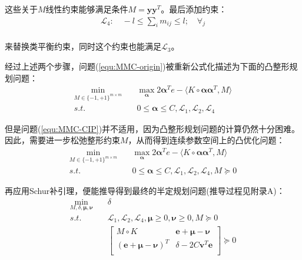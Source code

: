 这些关于$M$线性约束能够满足条件$M=\mathbf{yy}^T$。最后添加约束：
\begin{equation*}
\begin{split}
\mathcal{L}_4:\quad -l \le \sum_im_{ij} \le l; \quad \forall_j \\
\end{split}
\end{equation*}

来替换类平衡约束，同时这个约束也能满足$\mathcal{L}_3$。

经过上述两个步骤，问题(\ref{equ:MMC-origin})被重新公式化描述为下面的凸整形规划问题：
\begin{equation}
\begin{split}
\min_{M\in\{-1,+1\}^{m\times m}} \quad & \max_{\mathbf{\alpha}} 2\mathbf{\alpha}^Te-\langle K \circ \mathbf{\alpha}\mathbf{\alpha}^T,M \rangle \\ 
s.t. \quad & 0 \le \mathbf{\alpha} \le C,\mathcal{L}_1,\mathcal{L}_2,\mathcal{L}_4
\label{equ:MMC-CIP}
\end{split}
\end{equation}

但是问题(\ref{equ:MMC-CIP})并不适用，因为凸整形规划问题的计算仍然十分困难。因此，需要进一步松弛整形约束$M$，从而得到连续参数空间上的凸优化问题：
\begin{equation}
\begin{split}
\min_{M\in\{-1,+1\}^{m\times m}} \quad & \max_{\mathbf{\alpha}} 2\mathbf{\alpha}^Te-\langle K \circ \mathbf{\alpha}\mathbf{\alpha}^T,M \rangle \\ 
s.t. \quad & 0 \le \mathbf{\alpha} \le C,\mathcal{L}_1,\mathcal{L}_2,\mathcal{L}_4,M\succeq 0
\label{equ:MMC-CP}
\end{split}
\end{equation}

再应用Schur补引理，便能推导得到最终的半定规划问题(推导过程见附录A)：
\begin{equation}
\begin{split}
\min_{M,\delta,\mathbf{\mu},\mathbf{\nu}} \quad & \delta \\
s.t. \quad & \mathcal{L}_1,\mathcal{L}_2,\mathcal{L}_4,\mathbf{\mu} \ge 0,\mathbf{\nu} \ge 0, M \succeq 0 \\
&    \left[\begin{matrix}
      M \circ K & \mathbf{e} + \mathbf{\mu} - \mathbf{\nu} \\
      (\mathbf{e} + \mathbf{\mu} - \mathbf{\nu})^T & \delta - 2C\mathbf{v}^T\mathbf{e} \\
   \end{matrix}\right] \succeq 0
   \label{equ:MMC-SDP}
\end{split}
\end{equation}

